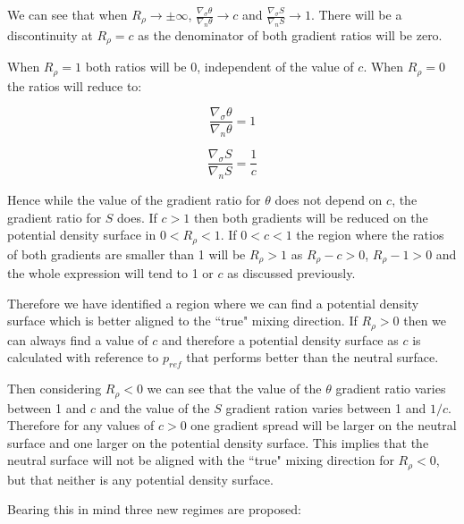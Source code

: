 We can see that when $R_\rho \to \pm \infty$, $\frac{\nabla_{\sigma}\theta}{\nabla_{n}\theta}\to c$ and $\frac{\nabla_{\sigma}S}{\nabla_{n}S}\to 1$. There will be a discontinuity at $R_\rho = c$ as the denominator of both gradient ratios will be zero. 

When $R_\rho = 1$ both ratios will be 0, independent of the value of $c$. When $R_\rho = 0$ the ratios will reduce to:

\begin{equation}
    \frac{\nabla_{\sigma}\theta}{\nabla_{n}\theta} = 1 
    \label{equation:gradient_ratio_theta_R_rho_0}
\end{equation}

\begin{equation}
    \frac{\nabla_{\sigma}S}{\nabla_{n}S} = \frac{1}{c} 
    \label{equation:gradient_ratio_s_R_rho_0}
\end{equation}

Hence while the value of the gradient ratio for $\theta$ does not depend on $c$, the gradient ratio for $S$ does. If $c>1$ then both gradients will be reduced on the potential density surface in $0<R_\rho<1$. If $0<c<1$ the region where the ratios of both gradients are smaller than 1 will be $R_\rho>1$ as $R_\rho-c>0$, $R_\rho -1 >0$ and the whole expression will tend to 1 or $c$ as discussed previously.

Therefore we have identified a region where we can find a potential density surface which is better aligned to the ``true" mixing direction. If $R_\rho>0$ then we can always find a value of $c$ and therefore a potential density surface as $c$ is calculated with reference to $p_{ref}$ that performs better than the neutral surface. 

Then considering $R_\rho<0$ we can see that the value of the $\theta$ gradient ratio varies between 1 and $c$ and the value of the $S$ gradient ration varies between 1 and $1/c$. Therefore for any values of $c>0$ one gradient spread will be larger on the neutral surface and one larger on the potential density surface. This implies that the neutral surface will not be aligned with the ``true" mixing direction for $R_\rho<0$, but that neither is any potential density surface. 

Bearing this in mind three new regimes are proposed:

